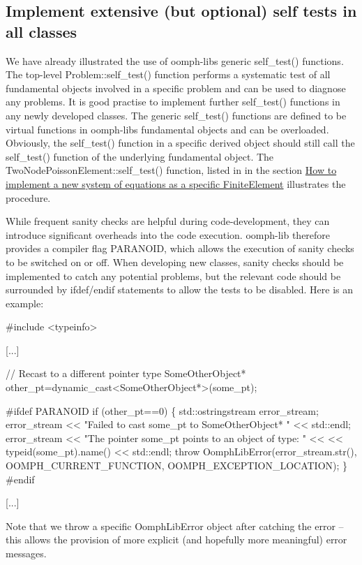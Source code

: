 \hypertarget{index_paranoia}{}\subsection{Implement extensive (but optional) self tests in all classes}\label{index_paranoia}
We have already illustrated the use of {\ttfamily oomph-\/lib\textquotesingle{}s} generic {\ttfamily self\+\_\+test()} functions. The top-\/level {\ttfamily Problem\+::self\+\_\+test()} function performs a systematic test of all fundamental objects involved in a specific problem and can be used to diagnose any problems. It is good practise to implement further {\ttfamily self\+\_\+test()} functions in any newly developed classes. The generic {\ttfamily self\+\_\+test()} functions are defined to be virtual functions in {\ttfamily oomph-\/lib\textquotesingle{}s} fundamental objects and can be overloaded. Obviously, the {\ttfamily self\+\_\+test()} function in a specific derived object should still call the {\ttfamily self\+\_\+test()} function of the underlying fundamental object. The {\ttfamily Two\+Node\+Poisson\+Element\+::self\+\_\+test()} function, listed in in the section \hyperlink{index_FEequations}{How to implement a new system of equations as a specific Finite\+Element} illustrates the procedure.

While frequent sanity checks are helpful during code-\/development, they can introduce significant overheads into the code execution. {\ttfamily oomph-\/lib} therefore provides a compiler flag P\+A\+R\+A\+N\+O\+ID, which allows the execution of sanity checks to be switched on or off. When developing new classes, sanity checks should be implemented to catch any potential problems, but the relevant code should be surrounded by {\ttfamily ifdef/endif} statements to allow the tests to be disabled. Here is an example\+: 
\begin{DoxyCode}
\textcolor{preprocessor}{ #include <typeinfo>}

  [...]

  \textcolor{comment}{// Recast to a different pointer type}
  SomeOtherObject* other\_pt=\textcolor{keyword}{dynamic\_cast<}SomeOtherObject*\textcolor{keyword}{>}(some\_pt);

\textcolor{preprocessor}{ #ifdef PARANOID}
  \textcolor{keywordflow}{if} (other\_pt==0)
   \{
   std::ostringstream error\_stream;
     error\_stream << \textcolor{stringliteral}{"Failed to cast some\_pt to SomeOtherObject* "}  
                  << std::endl;
     error\_stream << \textcolor{stringliteral}{"The pointer some\_pt points to an object of type: "} <<
                  << \textcolor{keyword}{typeid}(some\_pt).name() << std::endl; 
     \textcolor{keywordflow}{throw} OomphLibError(error\_stream.str(),
                         OOMPH\_CURRENT\_FUNCTION,
                         OOMPH\_EXCEPTION\_LOCATION);
    \}
\textcolor{preprocessor}{ #endif }

[...]
\end{DoxyCode}
 Note that we throw a specific {\ttfamily Oomph\+Lib\+Error} object after catching the error -- this allows the provision of more explicit (and hopefully more meaningful) error messages.

